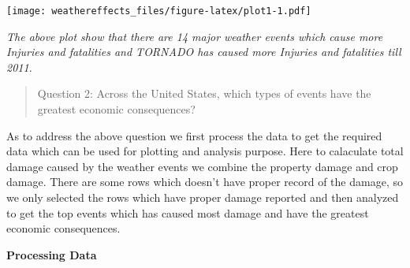 \documentclass[
]{article}
\begin{document}
\texttt{[image: weathereffects\_files/figure-latex/plot1-1.pdf]}

\emph{The above plot show that there are 14 major weather events which
cause more Injuries and fatalities and TORNADO has caused more Injuries
and fatalities till 2011.}

\begin{quote}
Question 2: Across the United States, which types of events have the
greatest economic consequences?
\end{quote}

As to address the above question we first process the data to get the
required data which can be used for plotting and analysis purpose. Here
to calaculate total damage caused by the weather events we combine the
property damage and crop damage. There are some rows which doesn't have
proper record of the damage, so we only selected the rows which have
proper damage reported and then analyzed to get the top events which has
caused most damage and have the greatest economic consequences.

\textbf{Processing Data}
\end{document}

